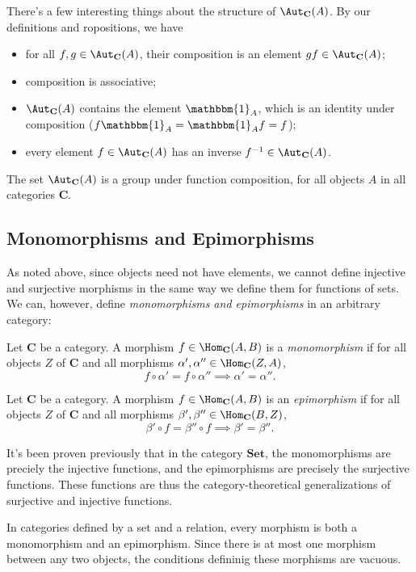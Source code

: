 There's a few interesting things about the structure of $\Aut_{ \mathbf{C} }( A ) $. By our definitions and ropositions, we have
\begin{itemize}
	\item for all $f,g\in \Aut_{ \mathbf{C} }( A ) $, their composition is an element $gf\in \Aut_{ \mathbf{C} }( A ) $;
	\item composition is associative;
	\item $\Aut_{ \mathbf{C} }( A ) $ contains the element $\mathbbm{1}_{A} $, which is an identity under composition ($f\mathbbm{1}_{A} =\mathbbm{1}_{A} f=f$);
	\item every element $f\in \Aut_{ \mathbf{C} }( A ) $ has an inverse $f^{-1}\in \Aut_{ \mathbf{C} }( A ) $.
\end{itemize}
The set $\Aut_{ \mathbf{C} }( A ) $ is a group under function composition, for all objects $A$ in all categories $\mathbf{C}$.
\subsection{Monomorphisms and Epimorphisms}
As noted above, since objects need not have elements, we cannot define injective and surjective morphisms in the same way we define them for functions of sets. We can, however, define \emph{monomorphisms and epimorphisms} in an arbitrary category:
\begin{definition}[Monomorphism]\label{dfn:1.4.5}
	Let $\mathbf{C}$ be a category. A morphism $f\in \Hom_{ \mathbf{C} }(A , B) $ is a \emph{monomorphism} if for all objects $Z$ of $\mathbf{C}$ and all morphisms $\alpha ',\alpha ''\in \Hom_{ \mathbf{C} }(Z , A) $,
	\[
		f\circ \alpha '=f\circ \alpha ''\implies \alpha '=\alpha ''
	.\]
\end{definition}
\begin{definition}[Epimorphism]\label{dfn:1.4.6}
	Let $\mathbf{C}$ be a category. A morphism $f\in \Hom_{ \mathbf{C} }(A , B) $ is an \emph{epimorphism} if for all objects $Z$ of $\mathbf{C}$ and all morphisms $\beta  ',\beta ''\in \Hom_{ \mathbf{C} }(B , Z) $,
	\[
		\beta '\circ f=\beta ''\circ f\implies \beta '=\beta ''
	.\]
\end{definition}
It's been proven previously that in the category $\mathbf{Set}$, the monomorphisms are preciely the injective functions, and the epimorphisms are precisely the surjective functions. These functions are thus the category-theoretical generalizations of surjective and injective functions.

In categories defined by a set and a relation, every morphism is both a monomorphism and an epimorphism. Since there is at most one morphism between any two objects, the conditions defininig these morphisms are vacuous.

